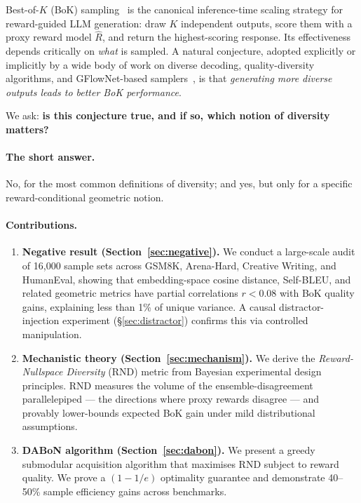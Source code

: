 \documentclass{article}
\newcommand{\Rhat}{\hat{R}}
\begin{document}
Best-of-$K$ (BoK) sampling~\citep{stiennon2020learning,nakano2021webgpt} is
the canonical inference-time scaling strategy for reward-guided LLM generation:
draw $K$ independent outputs, score them with a proxy reward model $\Rhat$, and
return the highest-scoring response.  Its effectiveness depends critically on
\emph{what} is sampled.  A natural conjecture, adopted explicitly or implicitly
by a wide body of work on diverse decoding, quality-diversity algorithms, and
GFlowNet-based samplers~\citep{jain2022biological,zhang2023diverse}, is that
\emph{generating more diverse outputs leads to better BoK performance}.

We ask: \textbf{is this conjecture true, and if so, which notion of diversity
matters?}

\paragraph{The short answer.}  No, for the most common definitions of diversity;
and yes, but only for a specific reward-conditional geometric notion.

\paragraph{Contributions.}
\begin{enumerate}
  \item \textbf{Negative result (Section~\ref{sec:negative}).}
    We conduct a large-scale audit of 16,000 sample sets across GSM8K, Arena-Hard,
    Creative Writing, and HumanEval, showing that embedding-space cosine
    distance, Self-BLEU, and related geometric metrics have partial
    correlations $r<0.08$ with BoK quality gains, explaining less than 1\%
    of unique variance.  A causal distractor-injection experiment
    (\S\ref{sec:distractor}) confirms this via controlled manipulation.

  \item \textbf{Mechanistic theory (Section~\ref{sec:mechanism}).}
    We derive the \emph{Reward-Nullspace Diversity} (RND) metric from
    Bayesian experimental design principles.  RND measures the volume of the
    ensemble-disagreement parallelepiped --- the directions where proxy
    rewards disagree --- and provably lower-bounds expected BoK gain under
    mild distributional assumptions.

  \item \textbf{DABoN algorithm (Section~\ref{sec:dabon}).}
    We present a greedy submodular acquisition algorithm that maximises RND
    subject to reward quality.  We prove a $(1-1/e)$ optimality guarantee
    and demonstrate 40--50\% sample efficiency gains across benchmarks.
\end{enumerate}
\end{document}
